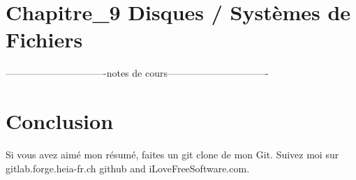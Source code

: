 

\newpage
\section{Chapitre\_9 Disques / Systèmes de Fichiers}
-------------------------------notes de cours-------------------------------



\newpage
\section{Conclusion}
Si vous avez aimé mon résumé, faites un git clone de mon Git. Suivez moi sur gitlab.forge.heia-fr.ch github and iLoveFreeSoftware.com.


